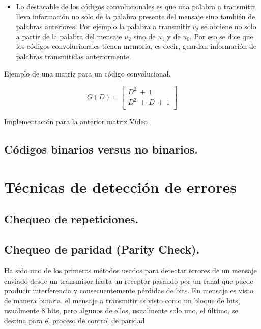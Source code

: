 \begin{itemize}
     \item  Lo destacable de los códigos convolucionales es que una palabra a transmitir lleva información no solo de la palabra presente del mensaje sino también de palabras anteriores. Por ejemplo la palabra a transmitir $v_{2}$ se obtiene no solo a partir de la palabra del mensaje $u_{2}$ sino de $u_{1}$ y de $u_{0}$. Por eso se dice que los códigos convolucionales tienen memoria, es decir, guardan información de palabras transmitidas anteriormente.
\end{itemize}

Ejemplo de una matriz para un código convolucional.

\begin{equation} \label{capsiete_veintitres}
G(D)=\begin{bmatrix}
    D^{2}  \ + \ 1  \\
    D^{2} \ + \ D \  + \ 1   \\
\end{bmatrix}
     \end{equation}

Implementación para la anterior matriz \textcolor{blue}{\href{https://www.youtube.com/watch?v=8dIwK77czQI&feature=youtu.be&list=PLRuN7jX1rOZNj4gDf-eepcpaqCY3HjcaC&t=2375}{Vídeo}}

\subsection{Códigos binarios versus no binarios.}

\section{Técnicas de detección de errores}

\subsection{Chequeo de repeticiones.}

\subsection{Chequeo de paridad (Parity Check).}

Ha sido uno de los primeros métodos usados para detectar errores de un mensaje enviado desde un transmisor hasta un receptor pasando por un canal que puede producir interferencia y consecuentemente pérdidas de bits. En mensaje es visto de manera binaria, el mensaje a transmitir es visto como un bloque de bits, usualmente 8 bits, pero algunos de ellos, usualmente solo uno, el último, se destina para el proceso de control de paridad. \\

